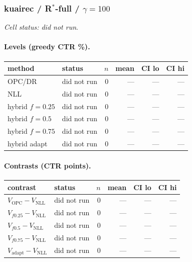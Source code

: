 \documentclass[10pt,a4paper]{article}
\begin{document}
\subsubsection{kuairec / R$^*$-full / $\gamma=100$}
\emph{Cell status: did not run}.
\paragraph{Levels (greedy CTR \%).}
{\centering\small\begin{tabular}{llrrrr}
\toprule method & status & $n$ & mean & CI lo & CI hi \\
\midrule
OPC/DR & did not run & 0 & --- & --- & --- \\
NLL & did not run & 0 & --- & --- & --- \\
hybrid $f{=}0.25$ & did not run & 0 & --- & --- & --- \\
hybrid $f{=}0.5$ & did not run & 0 & --- & --- & --- \\
hybrid $f{=}0.75$ & did not run & 0 & --- & --- & --- \\
hybrid adapt & did not run & 0 & --- & --- & --- \\
\bottomrule\end{tabular}\par}
\paragraph{Contrasts (CTR points).}
{\centering\small\begin{tabular}{llrrrr}
\toprule contrast & status & $n$ & mean & CI lo & CI hi \\
\midrule
$V_{\mathrm{OPC}}-V_{\mathrm{NLL}}$ & did not run & 0 & --- & --- & --- \\
$V_{f0.25}-V_{\mathrm{NLL}}$ & did not run & 0 & --- & --- & --- \\
$V_{f0.5}-V_{\mathrm{NLL}}$ & did not run & 0 & --- & --- & --- \\
$V_{f0.75}-V_{\mathrm{NLL}}$ & did not run & 0 & --- & --- & --- \\
$V_{\mathrm{adapt}}-V_{\mathrm{NLL}}$ & did not run & 0 & --- & --- & --- \\
\bottomrule\end{tabular}\par}
\end{document}
